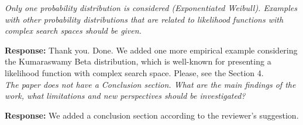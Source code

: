 \documentclass[a4paper,11pt]{exam}
\begin{document}
\begin{questions}
\question \textit{Only one probability distribution is considered (Exponentiated Weibull). Examples with other probability distributions that are related to likelihood functions with complex search spaces should be given.}

\noindent \textbf{Response:} Thank you. Done. We added one more empirical example con\-si\-der\-ing the Kumaraswamy Beta distribution, which is well-known for presenting a likelihood function with complex search space. Please, see the Section 4.\\

\question \textit{The paper does not have a Conclusion section. What are the main findings of the work, what limitations and new perspectives should be investigated?}

\noindent \textbf{Response:} We added a conclusion section according to the reviewer's suggestion.\\

\end{questions}
\end{document}
